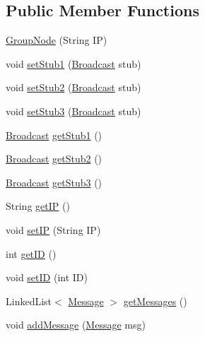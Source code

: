 \subsection*{Public Member Functions}
\begin{DoxyCompactItemize}
\item 
\hyperlink{classstructure_1_1_group_node_a22c95192d00d8f968102e79bee9b55d9}{Group\+Node} (String IP)
\item 
void \hyperlink{classstructure_1_1_group_node_a328fa38c77c507d7a6a4d36984cf0022}{set\+Stub1} (\hyperlink{interfaceserver_1_1_broadcast}{Broadcast} stub)
\item 
void \hyperlink{classstructure_1_1_group_node_a6baa802bddde09ff85c44fd92200b058}{set\+Stub2} (\hyperlink{interfaceserver_1_1_broadcast}{Broadcast} stub)
\item 
void \hyperlink{classstructure_1_1_group_node_a8195f402759827e1a5d179fad08a60d8}{set\+Stub3} (\hyperlink{interfaceserver_1_1_broadcast}{Broadcast} stub)
\item 
\hyperlink{interfaceserver_1_1_broadcast}{Broadcast} \hyperlink{classstructure_1_1_group_node_a60db881a161932baf99076509258eb50}{get\+Stub1} ()
\item 
\hyperlink{interfaceserver_1_1_broadcast}{Broadcast} \hyperlink{classstructure_1_1_group_node_a39de0cad8c3e43e938482c74683a291d}{get\+Stub2} ()
\item 
\hyperlink{interfaceserver_1_1_broadcast}{Broadcast} \hyperlink{classstructure_1_1_group_node_ac9b11b128f621dc8784dccc4fb5ceae1}{get\+Stub3} ()
\item 
String \hyperlink{classstructure_1_1_group_node_ac2f64cbb8eb9332df8663e80e1bb3f61}{get\+IP} ()
\item 
void \hyperlink{classstructure_1_1_group_node_a0baf2a9e22ec4685e7394a5f3d87a810}{set\+IP} (String IP)
\item 
int \hyperlink{classstructure_1_1_group_node_afb3b82694003309b6218f908110838c6}{get\+ID} ()
\item 
void \hyperlink{classstructure_1_1_group_node_af109d88d565e87b1da693278d504107a}{set\+ID} (int ID)
\item 
Linked\+List$<$ \hyperlink{classstructure_1_1_message}{Message} $>$ \hyperlink{classstructure_1_1_group_node_a8a0df6e9ac4997341fa90e3b844e8176}{get\+Messages} ()
\item 
void \hyperlink{classstructure_1_1_group_node_a0b6f67a6194009da3bca009c395e8f7a}{add\+Message} (\hyperlink{classstructure_1_1_message}{Message} msg)
\item 

\end{DoxyCompactItemize}
